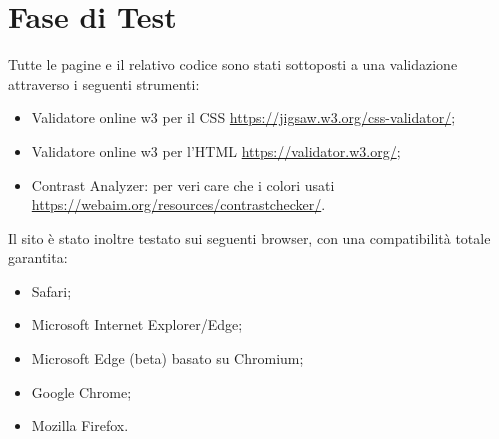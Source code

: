 \section{Fase di Test}
Tutte le pagine e il relativo codice sono stati sottoposti a una validazione attraverso i seguenti strumenti:
    \begin{itemize}
        \item Validatore online w3 per il CSS \url{https://jigsaw.w3.org/css-validator/};
        \item Validatore online w3 per l'HTML \url{https://validator.w3.org/};
        \item Contrast Analyzer: per vericare che i colori usati \url{https://webaim.org/resources/contrastchecker/}.
    \end{itemize}
    Il sito è stato inoltre testato sui seguenti browser, con una compatibilità totale garantita:
    \begin{itemize}
        \item Safari;
        \item Microsoft Internet Explorer/Edge;
        \item Microsoft Edge (beta) basato su Chromium;
        \item Google Chrome;
        \item Mozilla Firefox.
    \end{itemize}
    
\pagebreak